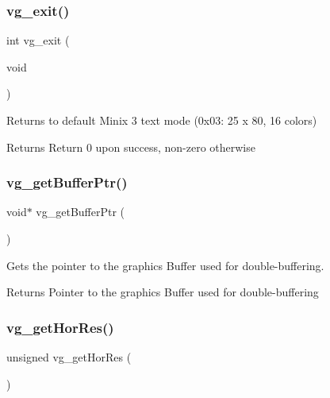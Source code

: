 \subsubsection{\texorpdfstring{vg\+\_\+exit()}{vg\_exit()}}
{\footnotesize\ttfamily int vg\+\_\+exit (\begin{DoxyParamCaption}\item[{void}]{ }\end{DoxyParamCaption})}



Returns to default Minix 3 text mode (0x03\+: 25 x 80, 16 colors) 

\begin{DoxyReturn}{Returns}
Return 0 upon success, non-\/zero otherwise 
\end{DoxyReturn}
\hypertarget{group__video__gr_gabd51eef0a4ffcafb6a08fb40703f4383}{}\label{group__video__gr_gabd51eef0a4ffcafb6a08fb40703f4383} 
\subsubsection{\texorpdfstring{vg\+\_\+get\+Buffer\+Ptr()}{vg\_getBufferPtr()}}
{\footnotesize\ttfamily void$\ast$ vg\+\_\+get\+Buffer\+Ptr (\begin{DoxyParamCaption}{ }\end{DoxyParamCaption})}



Gets the pointer to the graphics Buffer used for double-\/buffering. 

\begin{DoxyReturn}{Returns}
Pointer to the graphics Buffer used for double-\/buffering 
\end{DoxyReturn}
\hypertarget{group__video__gr_gab3938dd22c03335341584d5b8f6752f5}{}\label{group__video__gr_gab3938dd22c03335341584d5b8f6752f5} 
\subsubsection{\texorpdfstring{vg\+\_\+get\+Hor\+Res()}{vg\_getHorRes()}}
{\footnotesize\ttfamily unsigned vg\+\_\+get\+Hor\+Res (\begin{DoxyParamCaption}{ }\end{DoxyParamCaption})}



